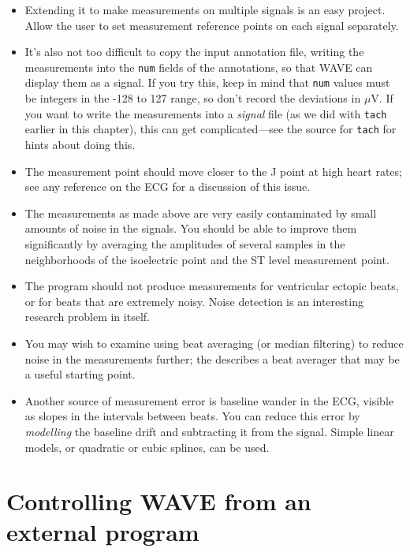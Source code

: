 \documentclass[twoside]{book}
\newcommand{\WAVE}{{\sf WAVE}\xspace}
\begin{document}
\begin{itemize}
\item
Extending it to make measurements on multiple signals is an easy project.
Allow the user to set measurement reference points on each signal separately.

\item
It's also not too difficult to copy the input annotation file, writing
the measurements into the {\tt num} fields of the annotations, so that
\WAVE{} can display them as a signal.  If you try this, keep in mind
that {\tt num} values must be integers in the -128 to 127 range, so
don't record the deviations in $\mu$V.  If you want to write the
measurements into a \emph{signal} file (as we did with {\tt tach}
earlier in this chapter), this can get complicated---see the source
for {\tt tach} for hints about doing this.

\item
The measurement point should move closer to the J point at high heart rates;
see any reference on the ECG for a discussion of this issue.

\item
The measurements as made above are very easily contaminated by small amounts
of noise in the signals.  You should be able to improve them significantly by
averaging the amplitudes of several samples in the neighborhoods of
the isoelectric point and the ST level measurement point.

\item
The program should not produce measurements for ventricular ectopic beats,
or for beats that are extremely noisy.  Noise detection is an
interesting research problem in itself.

\item
You may wish to examine using beat averaging (or median filtering) to reduce
noise in the measurements further; the
describes a beat averager that may be a useful starting point.

\item
Another source of measurement error is baseline wander in the ECG,
visible as slopes in the intervals between beats.  You can reduce this
error by \emph{modelling} the baseline drift and subtracting it from
the signal.  Simple linear models, or quadratic or cubic splines, can
be used.
\end{itemize}

\section{Controlling \WAVE{} from an external program}
\label{sec:wave-remote}
\end{document}
